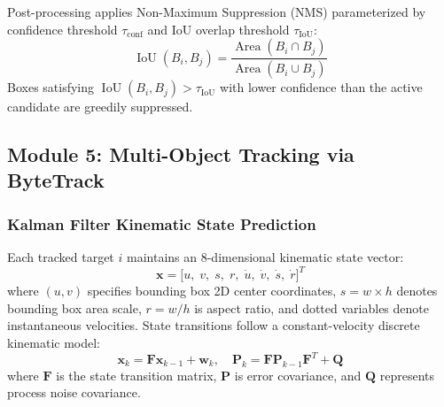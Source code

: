 Post-processing applies Non-Maximum Suppression (NMS) parameterized by confidence threshold $\tau_{\text{conf}}$ and IoU overlap threshold $\tau_{\text{IoU}}$:
\begin{equation}
    \operatorname{IoU}(B_i, B_j) = \frac{\operatorname{Area}(B_i \cap B_j)}{\operatorname{Area}(B_i \cup B_j)}
\end{equation}
Boxes satisfying $\operatorname{IoU}(B_i, B_j) > \tau_{\text{IoU}}$ with lower confidence than the active candidate are greedily suppressed.

\subsection{Module 5: Multi-Object Tracking via ByteTrack}

\subsubsection{Kalman Filter Kinematic State Prediction}
Each tracked target $i$ maintains an 8-dimensional kinematic state vector:
\begin{equation}
    \mathbf{x} = \Big[ u, \; v, \; s, \; r, \; \dot{u}, \; \dot{v}, \; \dot{s}, \; \dot{r} \Big]^T
\end{equation}
where $(u,v)$ specifies bounding box 2D center coordinates, $s = w \times h$ denotes bounding box area scale, $r = w/h$ is aspect ratio, and dotted variables denote instantaneous velocities. State transitions follow a constant-velocity discrete kinematic model:
\begin{equation}
    \mathbf{x}_k = \mathbf{F} \mathbf{x}_{k-1} + \mathbf{w}_k, \quad \mathbf{P}_k = \mathbf{F} \mathbf{P}_{k-1} \mathbf{F}^T + \mathbf{Q}
\end{equation}
where $\mathbf{F}$ is the state transition matrix, $\mathbf{P}$ is error covariance, and $\mathbf{Q}$ represents process noise covariance.


